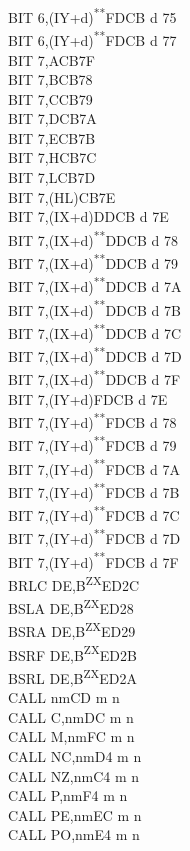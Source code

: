 \documentclass[12pt,twoside,openright,a4paper]{book}
\newcommand{\UNDOC}{\textnormal{\textsuperscript{**}}}
\newcommand{\ZXN}{\textnormal{\textsuperscript{ZX}}}
\begin{document}
\begin{multicols}{3}
{\begin{tabbing}
		BIT 6,(IY+d)\UNDOC\>FDCB d 75\\
		BIT 6,(IY+d)\UNDOC\>FDCB d 77\\
		BIT 7,A\>CB7F\\
		BIT 7,B\>CB78\\
		BIT 7,C\>CB79\\
		BIT 7,D\>CB7A\\
		BIT 7,E\>CB7B\\
		BIT 7,H\>CB7C\\
		BIT 7,L\>CB7D\\
		BIT 7,(HL)\>CB7E\\
		BIT 7,(IX+d)\>DDCB d 7E\\
		BIT 7,(IX+d)\UNDOC\>DDCB d 78\\
		BIT 7,(IX+d)\UNDOC\>DDCB d 79\\
		BIT 7,(IX+d)\UNDOC\>DDCB d 7A\\
		BIT 7,(IX+d)\UNDOC\>DDCB d 7B\\
		BIT 7,(IX+d)\UNDOC\>DDCB d 7C\\
		BIT 7,(IX+d)\UNDOC\>DDCB d 7D\\
		BIT 7,(IX+d)\UNDOC\>DDCB d 7F\\
		BIT 7,(IY+d)\>FDCB d 7E\\
		BIT 7,(IY+d)\UNDOC\>FDCB d 78\\
		BIT 7,(IY+d)\UNDOC\>FDCB d 79\\
		BIT 7,(IY+d)\UNDOC\>FDCB d 7A\\
		BIT 7,(IY+d)\UNDOC\>FDCB d 7B\\
		BIT 7,(IY+d)\UNDOC\>FDCB d 7C\\
		BIT 7,(IY+d)\UNDOC\>FDCB d 7D\\
		BIT 7,(IY+d)\UNDOC\>FDCB d 7F\\
		BRLC DE,B\ZXN\>ED2C\\
		BSLA DE,B\ZXN\>ED28\\
		BSRA DE,B\ZXN\>ED29\\
		BSRF DE,B\ZXN\>ED2B\\
		BSRL DE,B\ZXN\>ED2A\\
		CALL nm\>CD m n\\
		CALL C,nm\>DC m n\\
		CALL M,nm\>FC m n\\
		CALL NC,nm\>D4 m n\\
		CALL NZ,nm\>C4 m n\\
		CALL P,nm\>F4 m n\\
		CALL PE,nm\>EC m n\\
		CALL PO,nm\>E4 m n\\

\end{tabbing}}
\end{multicols}
\end{document}
